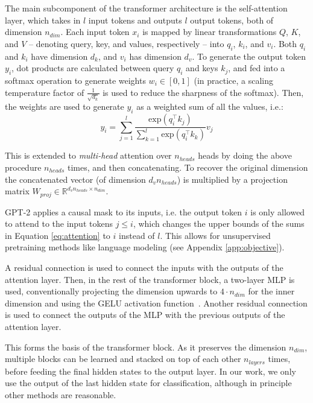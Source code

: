 The main subcomponent of the transformer architecture is the self-attention layer, which takes in $l$ input tokens and outputs $l$ output tokens, both of dimension $n_{dim}$.
Each input token $x_i$ is mapped by linear transformations $Q$, $K$, and $V$ -- denoting query, key, and values, respectively -- into $q_i$, $k_i$, and $v_i$.
Both $q_i$ and $k_i$ have dimension $d_k$, and $v_i$ has dimension $d_v$.
To generate the output token $y_i$, dot products are calculated between query $q_i$ and keys $k_j$, and fed into a softmax operation to generate weights $w_i \in [0, 1]$ (in practice, a scaling temperature factor of $\frac{1}{\sqrt{d_k}}$ is used to reduce the sharpness of the softmax).
Then, the weights are used to generate $y_i$ as a weighted sum of all the values, i.e.:
\begin{equation}\label{eq:attention}
    y_i = \sum_{j=1}^l \frac{\text{exp}(q_i^\top k_j)}{\sum_{k=1}^l \text{exp}(q_i^\top k_k)} v_j
\end{equation}

This is extended to \emph{multi-head} attention over $n_{heads}$ heads by doing the above procedure $n_{heads}$ times, and then concatenating.
To recover the original dimension the concatenated vector (of dimension $d_v n_{heads}$) is multiplied by a projection matrix $W_{proj} \in \mathbb{R}^{d_v n_{heads} \times n_{dim}}$.

GPT-2 applies a causal mask to its inputs, i.e. the output token $i$ is only allowed to attend to the input tokens $j \leq i$, which changes the upper bounds of the sums in Equation \ref{eq:attention} to $i$ instead of $l$.
This allows for unsupervised pretraining methods like language modeling (see Appendix \ref{app:objective}).

A residual connection is used to connect the inputs with the outputs of the attention layer.
Then, in the rest of the transformer block, a two-layer MLP is used, conventionally projecting the dimension upwards to $4 \cdot n_{dim}$ for the inner dimension and using the GELU activation function~\citep{hendrycks2016gelu}.
Another residual connection is used to connect the outputs of the MLP with the previous outputs of the attention layer.

This forms the basis of the transformer block.
As it preserves the dimension $n_{dim}$, multiple blocks can be learned and stacked on top of each other $n_{layers}$ times, before feeding the final hidden states to the output layer.
In our work, we only use the output of the last hidden state for classification, although in principle other methods are reasonable.

